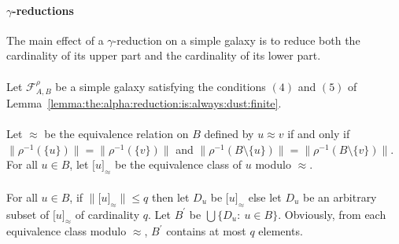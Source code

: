 \documentclass[draft]{article}
\begin{document}
\paragraph{$\gamma$-reductions}
%
%
The main effect of a $\gamma$-reduction on a simple galaxy is to reduce both the cardinality of its upper part and the cardinality of its lower part.
%
%
\\
\\
%
%
Let ${\mathcal F}_{A,B}^{\rho}$ be a simple galaxy satisfying the conditions $(4)$ and $(5)$ of Lemma~\ref{lemma:the:alpha:reduction:is:always:dust:finite}.
%
%
\\
\\
%
%
Let $\approx$ be the equivalence relation on $B$ defined by $u{\approx}v$ if and only if ${\parallel}\rho^{{-}1}(\{u\}){\parallel}
%
%
%
%
%
%
%
%
%
%
%
%
$\linebreak$
%
%
%
%
%
%
%
%
%
%
%
%
{=}{\parallel}\rho^{{-}1}(\{v\}){\parallel}$ and ${\parallel}\rho^{{-}1}(B{\setminus}\{u\}){\parallel}{=}{\parallel}\rho^{{-}1}(B{\setminus}\{v\}){\parallel}$.
For all $u{\in}B$, let $\lbrack u\rbrack_{\approx}$ be the equivalence class of $u$ modulo $\approx$.
%
%
\\
\\
%
%
For all $u{\in}B$, if ${\parallel}\lbrack u\rbrack_{\approx}{\parallel}{\leq}q$ then let $D_{u}$ be $\lbrack u\rbrack_{\approx}$ else let $D_{u}$ be an arbitrary subset of $\lbrack u\rbrack_{\approx}$ of cardinality $q$.
Let $B^{\prime}$ be $\bigcup\{D_{u}:\ u{\in}B\}$.
Obviously, from each equivalence class modulo $\approx$, $B^{\prime}$ contains at most $q$ elements.
\end{document}
